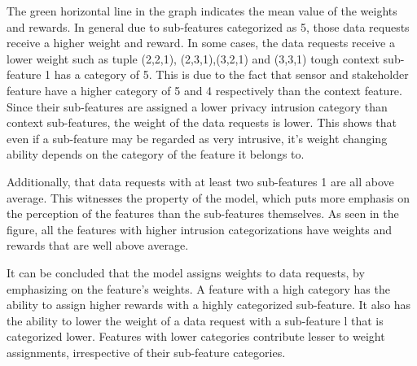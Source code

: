 %

The green horizontal line in the graph indicates the mean value of the weights and rewards. In general due to sub-features categorized as 5, those data requests receive a higher weight and reward. In some cases, the data requests receive a lower weight such as tuple (2,2,1),
(2,3,1),(3,2,1) and (3,3,1) tough context sub-feature 1 has a category of 5. This is due to the fact that sensor and stakeholder feature have a higher category of 5 and 4 respectively than the context feature. Since their sub-features are assigned a lower privacy intrusion category than context sub-features, the weight of the data requests is lower. This shows that even if a sub-feature may be regarded as very intrusive, it's weight changing ability depends on the category of the feature it belongs to.

Additionally, that data requests with at least two sub-features 1 are all above average. This witnesses the property of the model, which puts more emphasis on the perception of the features than the sub-features themselves. As seen in the figure, all the features with higher intrusion categorizations have weights and rewards that are well above average.

It can be concluded that the model assigns weights to data requests, by emphasizing on the feature's weights. A feature with a high category
has the ability to assign higher rewards with a highly categorized sub-feature. It also has the ability to lower the weight of a data request with a sub-feature l that is categorized lower. Features with lower categories contribute lesser to weight assignments, irrespective of their sub-feature categories.







